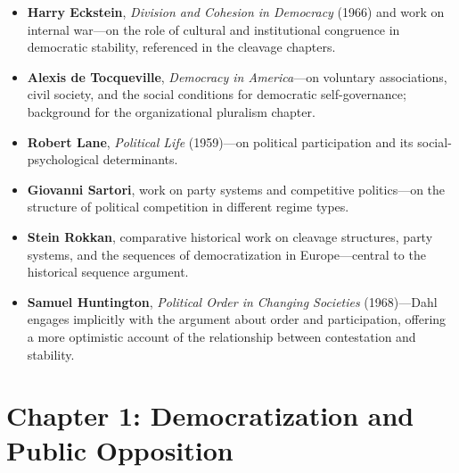 \documentclass[12pt]{article}
\begin{document}
\begin{itemize}[leftmargin=*, itemsep=4pt]
    \item \textbf{Harry Eckstein}, \textit{Division and Cohesion in Democracy} (1966) and work on internal war---on the role of cultural and institutional congruence in democratic stability, referenced in the cleavage chapters.
    \item \textbf{Alexis de Tocqueville}, \textit{Democracy in America}---on voluntary associations, civil society, and the social conditions for democratic self-governance; background for the organizational pluralism chapter.
    \item \textbf{Robert Lane}, \textit{Political Life} (1959)---on political participation and its social-psychological determinants.
    \item \textbf{Giovanni Sartori}, work on party systems and competitive politics---on the structure of political competition in different regime types.
    \item \textbf{Stein Rokkan}, comparative historical work on cleavage structures, party systems, and the sequences of democratization in Europe---central to the historical sequence argument.
    \item \textbf{Samuel Huntington}, \textit{Political Order in Changing Societies} (1968)---Dahl engages implicitly with the argument about order and participation, offering a more optimistic account of the relationship between contestation and stability.
\end{itemize}

\section{Chapter 1: Democratization and Public Opposition}
\end{document}
